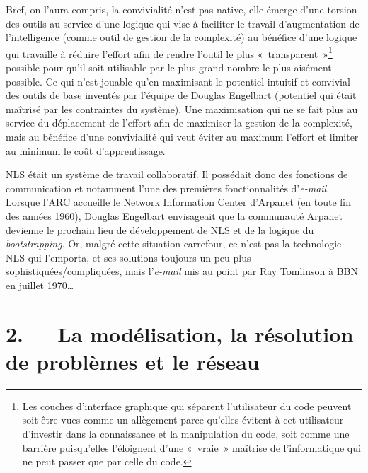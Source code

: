 \documentclass{FramateX}
\begin{document}
\begin{refsection}
Bref, on l'aura compris, la convivialité n'est pas native, elle émerge
d'une torsion des outils au service d'une logique qui vise à faciliter
le travail d'augmentation de l'intelligence (comme outil de gestion de
la complexité) au bénéfice d'une logique qui travaille à réduire
l'effort afin de rendre l'outil le plus «~transparent~»\footnote{Les
couches d'interface graphique qui séparent l'utilisateur du code
peuvent soit être vues comme un allègement parce qu'elles évitent à cet
utilisateur d'investir dans la connaissance et la manipulation du code,
soit comme une barrière puisqu'elles l'éloignent d'une «~vraie~»
maîtrise de l'informatique qui ne peut passer que par celle du code.}
 possible pour qu'il soit utilisable par le plus grand nombre
le plus aisément possible. Ce qui n'est jouable qu'en maximisant le
potentiel intuitif et convivial des outils de base inventés par
l'équipe de Douglas Engelbart (potentiel qui était maîtrisé par les
contraintes du système). Une maximisation qui ne se fait plus au
service du déplacement de l'effort afin de maximiser la gestion de la
complexité, mais au bénéfice d'une convivialité qui veut éviter au
maximum l'effort et limiter au minimum le coût d'apprentissage. 

NLS était un système de travail collaboratif. Il possédait donc des
fonctions de communication et notamment l'une des premières
fonctionnalités d'\textit{e-mail}. Lorsque l'ARC accueille le Network
Information Center d'Arpanet (en toute fin des années 1960), Douglas
Engelbart envisageait que la communauté Arpanet devienne le prochain
lieu de développement de NLS et de la logique du \textit{bootstrapping}. Or,
malgré cette situation carrefour, ce n'est pas la technologie NLS qui
l'emporta, et ses solutions toujours un peu plus
sophistiquées/compliquées, mais l'\textit{e-mail} mis au point par Ray Tomlinson
à BBN en juillet 1970\ldots

\section*{2.~~~La modélisation, la résolution de problèmes et le réseau}
{}



\end{refsection}
\end{document}
